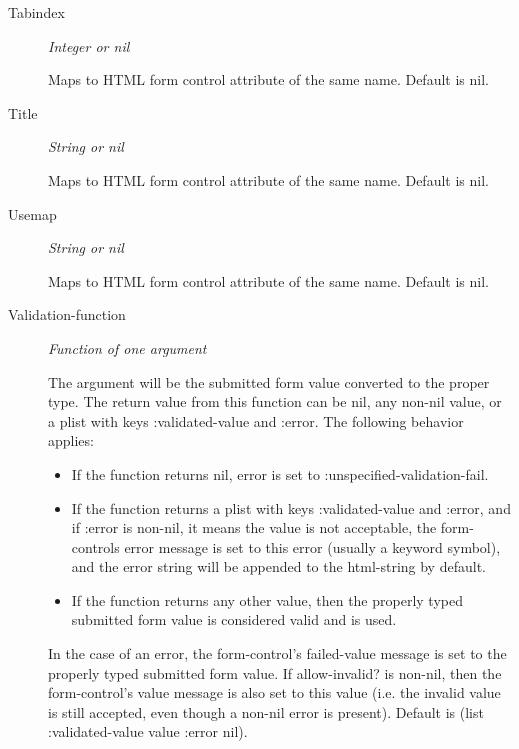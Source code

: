\documentclass [11pt]{book}
\begin{document}
\begin{itemize}
\begin{description}
\item [Tabindex]
\emph{Integer or nil}

 Maps to HTML form control attribute of the same name. Default is nil.




\item [Title]
\emph{String or nil}

 Maps to HTML form control attribute of the same name. Default is nil.




\item [Usemap]
\emph{String or nil}

 Maps to HTML form control attribute of the same name. Default is nil.




\item [Validation-function]
\emph{Function of one argument}

 The argument will be the submitted form value converted to the proper type.
The return value from this function can be nil, any non-nil value, or a plist with keys :validated-value
and :error. The following behavior applies:


\begin{itemize}

\item  If the function returns nil, error is set to  :unspecified-validation-fail.

\item  If the function returns a plist with keys :validated-value and :error, and if :error is non-nil,
it means the value is not acceptable, the form-controls error message is set to this error (usually a keyword symbol),
and the error string will be appended to the html-string by default. 

\item  If the function returns any other value, then the properly typed submitted form value is considered valid and is used.


\end{itemize}


In the case of an error, the form-control's failed-value message is set to the properly typed submitted form value. If
allow-invalid? is non-nil, then the form-control's value message is also set to this value (i.e. the invalid value is
still accepted, even though a non-nil error is present).
Default is (list :validated-value value :error nil).





\end{description}
\end{itemize}
\end{document}
